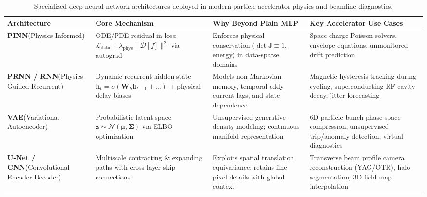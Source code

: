 \documentclass[11pt,a4paper]{article}
\begin{document}
\begin{table}[h!]
\centering
\small
\setlength{\tabcolsep}{4pt}
\begin{tabular}{@{}p{2.5cm} p{3.3cm} p{4.2cm} p{4.7cm}@{}}
\toprule
\textbf{Architecture} & \textbf{Core Mechanism} & \textbf{Why Beyond Plain MLP} & \textbf{Key Accelerator Use Cases} \\
\midrule
\textbf{PINN}\newline (Physics-Informed) & ODE/PDE residual in loss: $\mathcal{L}_{\text{data}} + \lambda_{\text{phys}}\|\mathcal{D}[f]\|^2$ via autograd & Enforces physical conservation ($\det\mathbf{J}\equiv 1$, energy) in data-sparse domains & Space-charge Poisson solvers, envelope equations, unmonitored drift prediction \\
\midrule
\textbf{PRNN / RNN}\newline (Physics-Guided Recurrent) & Dynamic recurrent hidden state $\mathbf{h}_t = \sigma(\mathbf{W}_h \mathbf{h}_{t-1} + \dots)$ + physical delay biases & Models non-Markovian memory, temporal eddy current lags, and state dependence & Magnetic hysteresis tracking during cycling, superconducting RF cavity decay, jitter forecasting \\
\midrule
\textbf{VAE}\newline (Variational Autoencoder) & Probabilistic latent space $\mathbf{z}\sim\mathcal{N}(\boldsymbol{\mu},\boldsymbol{\Sigma})$ via ELBO optimization & Unsupervised generative density modeling; continuous manifold representation & 6D particle bunch phase-space compression, unsupervised trip/anomaly detection, virtual diagnostics \\
\midrule
\textbf{U-Net / CNN}\newline (Convolutional Encoder-Decoder) & Multiscale contracting \& expanding paths with cross-layer skip connections & Exploits spatial translation equivariance; retains fine pixel details with global context & Transverse beam profile camera reconstruction (YAG/OTR), halo segmentation, 3D field map interpolation \\
\bottomrule
\end{tabular}
\caption{Specialized deep neural network architectures deployed in modern particle accelerator physics and beamline diagnostics.}
\label{tab:specialized_nn_architectures}
\end{table}
\end{document}
